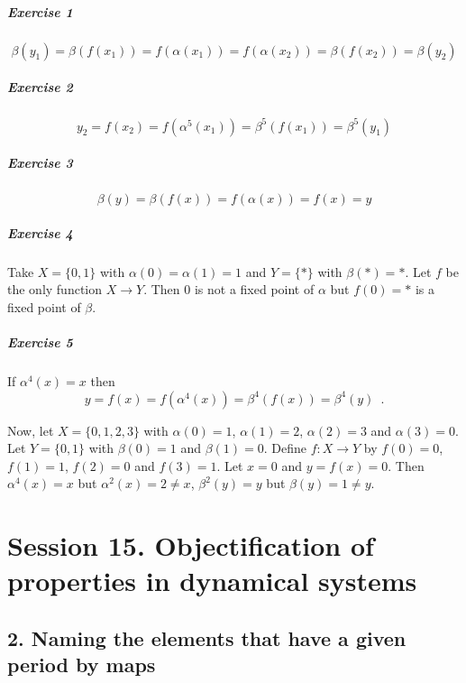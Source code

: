 \documentclass{report}
\begin{document}
    \paragraph{Exercise 1}
    \[ \beta(y_1) = \beta(f(x_1)) = f(\alpha(x_1)) = f(\alpha(x_2)) = \beta(f(x_2)) = \beta(y_2) \]

    \paragraph{Exercise 2}
    \[ y_2 = f(x_2) = f(\alpha^5(x_1)) = \beta^5(f(x_1)) = \beta^5(y_1) \]

    \paragraph{Exercise 3}
    \[ \beta(y) = \beta(f(x)) = f(\alpha(x)) = f(x) = y \]

    \paragraph{Exercise 4}
    Take $X = \{ 0,1 \}$ with $\alpha(0) = \alpha(1) = 1$ and $Y = \{ * \}$ with $\beta(*) = *$.
    Let $f$ be the only function $X \rightarrow Y$. Then 0 is not a fixed point of $\alpha$
    but $f(0) = *$ is a fixed point of $\beta$.

    \paragraph{Exercise 5}
    If $\alpha^4(x) = x$ then
    \[ y = f(x) = f(\alpha^4(x)) = \beta^4(f(x)) = \beta^4(y) \enspace . \]

    Now, let $X = \{ 0, 1, 2, 3 \}$ with $\alpha(0) = 1$, $\alpha(1) = 2$, $\alpha(2) = 3$ and $\alpha(3) = 0$.
    Let $Y = \{ 0,1 \}$ with $\beta(0) = 1$ and $\beta(1) = 0$. Define $f : X \rightarrow Y$ by $f(0) = 0$,
    $f(1) = 1$, $f(2) = 0$ and $f(3) = 1$. Let $x = 0$ and $y = f(x) = 0$. Then $\alpha^4(x) = x$ but
    $\alpha^2(x) = 2 \neq x$, $\beta^2(y) = y$ but $\beta(y) = 1 \neq y$.

    \chapter{Session 15. Objectification of properties in dynamical systems}
    \section{2. Naming the elements that have a given period by maps}
\end{document}
